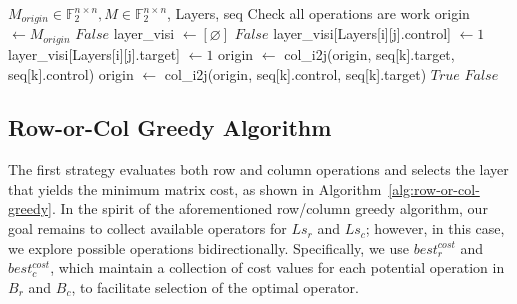 \begin{algorithm}[htbp]
\caption{Verify\_All}
\label{alg:verify-all}
\begin{algorithmic}[1]
\Require $M_{origin} \in \mathbb{F}_{2}^{n \times n}, M \in \mathbb{F}_{2}^{n \times n}$, Layers, seq
\Ensure Check all operations are work
\State origin $\leftarrow M_{origin}$ 
 
	\State \Return $False$
\EndIf
{}
	\State layer\_visi $\leftarrow [\varnothing]$ 
			\State \Return $False$ 
		\Else
			\State layer\_visi[Layers[i][j].control] $\leftarrow 1$ 
			\State layer\_visi[Layers[i][j].target] $\leftarrow 1$ 
		\EndIf
	\EndFor
\EndFor
{}
		\State origin $\leftarrow$ col\_i2j(origin, seq[k].target, seq[k].control) 
	\Else
		\State origin $\leftarrow$ col\_i2j(origin, seq[k].control, seq[k].target) 
	\EndIf
\EndFor
{} 
	\State \Return $True$
\Else
	\State \Return $False$
\EndIf
\end{algorithmic}
\end{algorithm}

\subsection{Row-or-Col Greedy Algorithm}
The first strategy evaluates both row and column operations and selects 
the layer that yields the minimum matrix cost, as shown in 
Algorithm~\ref{alg:row-or-col-greedy}. In the spirit of the aforementioned 
row/column greedy algorithm, our goal remains to collect available 
operators for $Ls_{r}$ and $Ls_{c}$; however, in this case, we explore 
possible operations bidirectionally. Specifically, we use 
$best_{r}^{cost}$ and $best_{c}^{cost}$, which maintain a collection of 
cost values for each potential operation in $B_{r}$ and $B_{c}$, to 
facilitate selection of the optimal operator.

